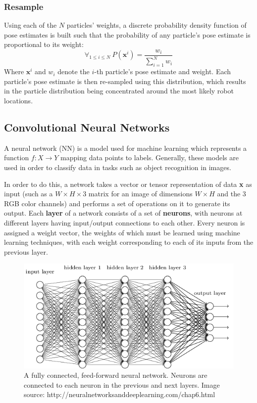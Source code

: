 \documentclass[letterpaper, 12 pt, conference]{ieeeconf}  %
\begin{document}
\subsubsection{Resample} 
Using each of the $N$ particles' weights, a discrete probability density function of pose estimates is built such that the probability of any particle's pose estimate is proportional to its weight: 
$$
\forall _{1\leq i \leq N}~P(\textbf{x}^i)=\frac{w_i}{\sum _{i=1} ^N w_i}
$$
Where $\textbf{x}^i$ and $w_i$ denote the $i$-th particle's pose estimate and weight. Each particle's pose estimate is then re-sampled using this distribution, which results in the particle distribution being concentrated around the most likely robot locations.  

\subsection{Convolutional Neural Networks}

A neural network (NN) is a model used for machine learning which represents a function $f:X\to Y$ mapping data points to labels. Generally, these models are used in order to classify data in tasks such as object recognition in images. 
\par
In order to do this, a network takes a vector or tensor representation of data \textbf{x} as input (such as a $W\times H \times 3$ matrix for an image of dimensions $W\times H$ and the 3 RGB color channels) and performs a set of operations on it to generate its output. Each \textbf{layer} of a network consists of a set of \textbf{neurons}, with neurons at different layers having input/output connections to each other. Every neuron is assigned a weight vector, the weights of which must be learned using machine learning techniques, with each weight corresponding to each of its inputs from the previous layer.  

\begin{figure}[h]
\centering
\includegraphics[scale=0.75]{neural_net}
\caption{A fully connected, feed-forward neural network. Neurons are connected to each neuron in the previous and next layers. Image source: http://neuralnetworksanddeeplearning.com/chap6.html}
\end{figure}
\end{document}

